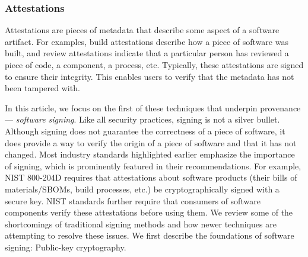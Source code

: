 \documentclass{IEEEcsmagTechrxiv}
\begin{document}
\subsubsection{Attestations}
Attestations are pieces of metadata that describe some aspect of a software artifact.
For examples, build attestations describe how a piece of software was built, and review attestations indicate that a particular person has reviewed a piece of code, a component, a process, etc.
Typically, these attestations are signed to ensure their integrity.
This enables users to verify that the metadata has not been tampered with.

\vspace{10pt}


In this article, we focus on the first of these techniques that underpin provenance --- \textit{software signing}.
Like all security practices, signing is not a silver bullet.
Although signing does not guarantee the correctness of a piece of software, it does provide a way to verify the origin of a piece of software and that it has not changed.
Most industry standards highlighted earlier emphasize the importance of signing, which is prominently featured in their recommendations.
For example, NIST 800-204D requires that attestations about software products (\eg their bills of materials/SBOMs, build processes, etc.) be cryptographically signed with a secure key.
NIST standards further require that consumers of software components verify these attestations before using them.
We review some of the shortcomings of traditional signing methods and how newer techniques are attempting to resolve these issues.
We first describe the foundations of software signing: Public-key cryptography.

\end{document}
